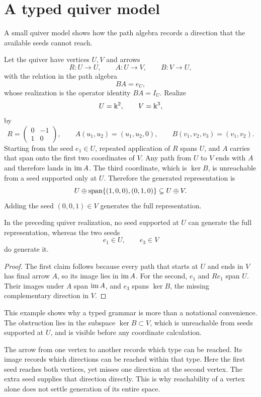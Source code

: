 \section{A typed quiver model}

A small quiver model shows how the path algebra records a direction that the available seeds cannot reach.

Let the quiver have vertices $U,V$ and arrows
\[
R:U\to U,
\qquad
A:U\to V,
\qquad
B:V\to U,
\]
with the relation in the path algebra
\[
BA=e_U,
\]
whose realization is the operator identity $BA=I_U$.
Realize
\[
U=\Bbbk^2,
\qquad
V=\Bbbk^3,
\]
by
\[
R=
\begin{pmatrix}0&-1\\1&0\end{pmatrix},
\qquad
A(u_1,u_2)=(u_1,u_2,0),
\qquad
B(v_1,v_2,v_3)=(v_1,v_2).
\]
Starting from the seed $e_1\in U$, repeated application of $R$ spans $U$, and $A$ carries that span onto the first two coordinates of $V$. Any path from $U$ to $V$ ends with $A$ and therefore lands in $\operatorname{im} A$. The third coordinate, which is $\ker B$, is unreachable from a seed supported only at $U$. Therefore the generated representation is
\[
U\oplus\operatorname{span}\{(1,0,0),(0,1,0)\}
\subsetneq U\oplus V.
\]
Adding the seed $(0,0,1)\in V$ generates the full representation.

\begin{proposition}
\label{prop:typed-reachability}
In the preceding quiver realization, no seed supported at $U$ can generate the full representation, whereas the two seeds
\[
e_1\in U,
\qquad
e_3\in V
\]
do generate it.
\end{proposition}

\begin{proof}
The first claim follows because every path that starts at $U$ and ends in $V$ has final arrow $A$, so its image lies in $\operatorname{im} A$. For the second, $e_1$ and $Re_1$ span $U$. Their images under $A$ span $\operatorname{im} A$, and $e_3$ spans $\ker B$, the missing complementary direction in $V$.
\end{proof}

This example shows why a typed grammar is more than a notational convenience. The obstruction lies in the subspace $\ker B\subset V$, which is unreachable from seeds supported at $U$, and is visible before any coordinate calculation.

The arrow from one vertex to another records which type can be reached. Its image records which directions can be reached within that type. Here the first seed reaches both vertices, yet misses one direction at the second vertex. The extra seed supplies that direction directly. This is why reachability of a vertex alone does not settle generation of its entire space.

